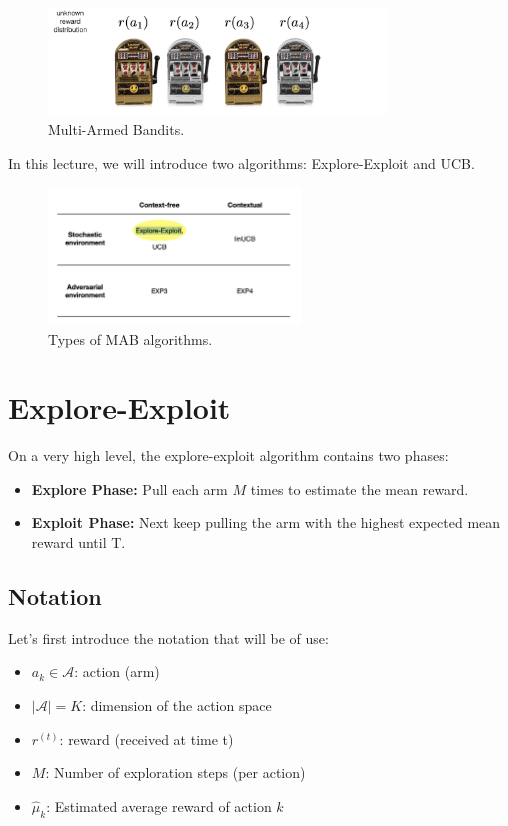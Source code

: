 \documentclass[11pt]{article}
\begin{document}
\begin{figure}[H]
    \centering
    \includegraphics[width=0.8\textwidth]{figs/bandits.png}
    \caption{Multi-Armed Bandits.}
\end{figure}
In this lecture, we will introduce two algorithms: Explore-Exploit and UCB.
\begin{figure}[t]
    \centering
    \includegraphics[width=0.6\textwidth]{figs/types.png}
    \caption{Types of MAB algorithms.}
\end{figure}

\section{Explore-Exploit}
On a very high level, the explore-exploit algorithm contains two phases:
\begin{itemize}
    \item \textbf{Explore Phase:} Pull each arm $M$ times to estimate the mean reward.
    \item \textbf{Exploit Phase:} Next keep pulling the arm with the highest expected mean reward until T.
\end{itemize}

\subsection{Notation}
Let's first introduce the notation that will be of use:
\begin{itemize}
    \item $a_k \in \mathcal{A}$: action (arm)
    \item $|\mathcal{A}| = K$: dimension of the action space
    \item $r^{(t)}$: reward (received at time t)
    \item $M$: Number of exploration steps (per action)
    \item $\widehat{\mu}_k$: Estimated average reward of action $k$
\end{itemize}
\end{document}
